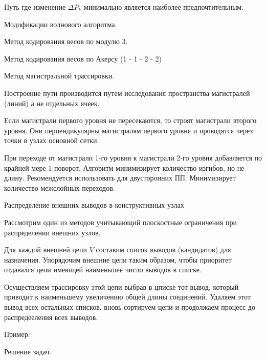 \documentclass{article}
\begin{document}
Путь где изменение $ \Delta P_k$ минимально является наиболее предпочтительным.

Модификации волнового алгоритма.

Метод кодирования весов по модулю 3.

Метод кодирования весов по Акерсу (1 - 1 - 2 - 2)

Метод магистральной трассировки.

Построение пути производится путем исследования пространства магистралей (линий) а не отдельных ячеек.

Если магистрали первого уровня не пересекаются, то строят магистрали второго уровня. Они перпендикулярны магистралям первого уровня и проводятся через точки в узлах основной сетки.

При переходе от магистрали 1-го уровня к магистрали 2-го уровня добавляется по крайней мере 1 поворот.
Алгоритм минимизирует количество изгибов, но не длину. Рекомендуется использовать для двусторонних ПП. Минимизирует количество межслойных переходов.

Распределение внешних выводов в конструктивных узлах

Рассмотрим один из методов учитывающий плоскостные ограничения при распределении внешних узлов.

Для каждой внешней цепи $V$ составим список выводов (кандидатов) для назначения. Упорядочим внешние цепи таким образом, чтобы приоритет отдавался цепи имеющей наименьшее число выводов в списке.

Осуществляем трассировку этой цепи выбрав в цписке тот вывод, который приводит к наименьшему увеличению общей длины соединений. Удаляем этот вывод всех остальных списков, вновь сортируем цепи и продолжаем процесс до распредееления всех выводов.

Пример:

Решение задач.
\end{document}
